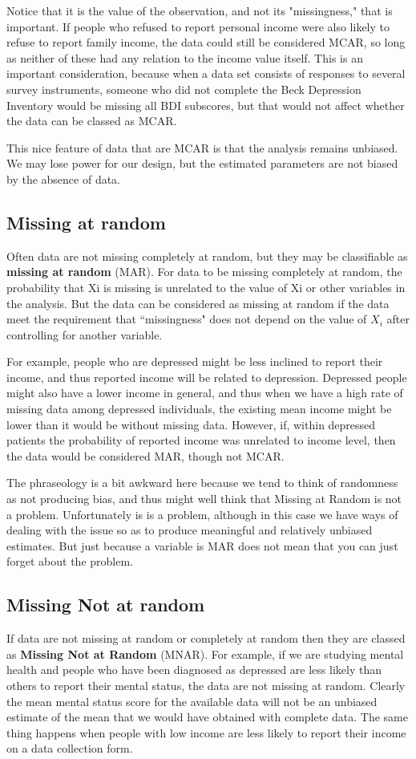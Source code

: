 \documentclass[12pt, a4paper]{report}
\begin{document}
Notice that it is the value of the observation, and not its "missingness," that is important. If people who refused to report personal income were also likely to refuse to report family income, the data could still be considered MCAR, so long as neither of these had any relation to the income value itself. This is an important consideration, because when a data set consists of responses to several survey instruments, someone who did not complete the Beck Depression Inventory would be missing all BDI subscores, but that would not affect whether the data can be classed as MCAR.

This nice feature of data that are MCAR is that the analysis remains unbiased. We may lose power for our design, but the estimated parameters are not biased by the absence of data.

\subsection{Missing at random}
Often data are not missing completely at random, but they may be classifiable as \textbf{missing at random} (MAR). For data to be missing completely at random, the probability that Xi is missing is unrelated to the value of Xi or other variables in the analysis. But the data can be considered as missing at random if the data meet the requirement that ``missingness" does not depend on the value of $X_i$ after controlling for another variable.

For example, people who are depressed might be less inclined to report their income, and thus reported income will be related to depression. Depressed people might also have a lower income in general, and thus when we have a high rate of missing data among depressed individuals, the existing mean income might be lower than it would be without missing data. However, if, within depressed patients the probability of reported income was unrelated to income level, then the data would be considered MAR, though not MCAR.

The phraseology is a bit awkward here because we tend to think of randomness as not producing bias, and thus might well think that Missing at Random is not a problem. Unfortunately is is a problem, although in this case we have ways of dealing with the issue so as to produce meaningful and relatively unbiased estimates. But just because a variable is MAR does not mean that you can just forget about the problem.

\subsection{Missing Not at random}
If data are not missing at random or completely at random then they are classed as \textbf{Missing Not at Random} (MNAR). For example, if we are studying mental health and people who have been diagnosed as depressed are less likely than others to report their mental status, the data are not missing at random. Clearly the mean mental status score for the available data will not be an unbiased estimate of the mean that we would have obtained with complete data. The same thing happens when people with low income are less likely to report their income on a data collection form.
\end{document}
